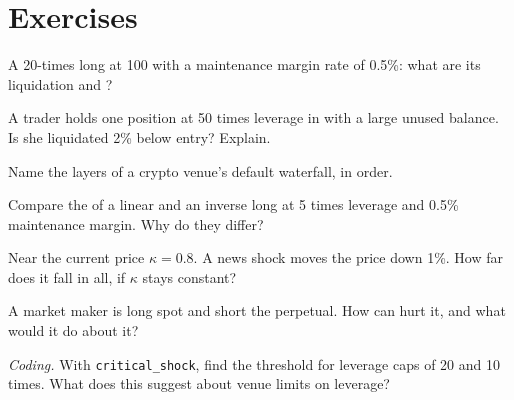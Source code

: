 \section{Exercises}

\begin{exercise}[$\star$]\label{exo:m3:margin-liquidation-and-loss-allocation:1}
A 20-times long at 100 with a maintenance margin rate of 0.5\%: what are its liquidation and ?
\end{exercise}

\begin{exercise}[$\star$]\label{exo:m3:margin-liquidation-and-loss-allocation:2}
A trader holds one position at 50 times leverage in  with a large unused balance. Is she liquidated 2\% below
entry? Explain.
\end{exercise}

\begin{exercise}[$\star$]\label{exo:m3:margin-liquidation-and-loss-allocation:3}
Name the layers of a crypto venue's default waterfall, in order.
\end{exercise}

\begin{exercise}[$\star\star$]\label{exo:m3:margin-liquidation-and-loss-allocation:4}
Compare the  of a linear and an inverse long at 5 times leverage and 0.5\% maintenance margin. Why do
they differ?
\end{exercise}

\begin{exercise}[$\star\star$]\label{exo:m3:margin-liquidation-and-loss-allocation:5}
Near the current price $\kappa = 0.8$. A news shock moves the price down 1\%. How far does it fall in all, if $\kappa$
stays constant?
\end{exercise}

\begin{exercise}[$\star\star$]\label{exo:m3:margin-liquidation-and-loss-allocation:6}
A market maker is long spot and short the perpetual. How can  hurt it, and what would it do about it?
\end{exercise}

\begin{exercise}[$\star\star\star$]\label{exo:m3:margin-liquidation-and-loss-allocation:7}
\emph{Coding.} With \texttt{critical\_shock}, find the threshold for leverage caps of 20 and 10 times. What does this
suggest about venue limits on leverage?
\end{exercise}


